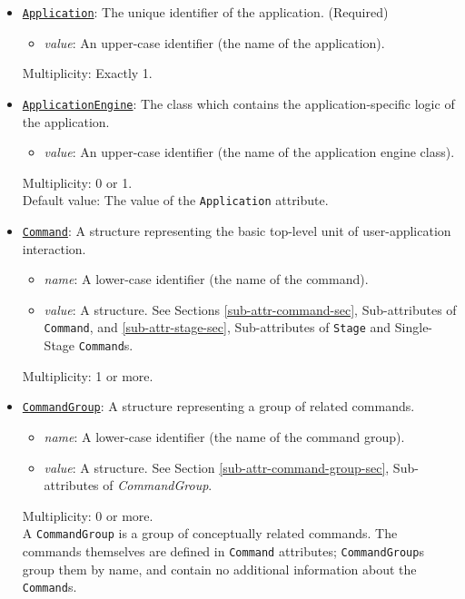 \documentclass[11pt]{article}
\begin{document}
\begin{itemize}

\item \underline{\tt Application}:  The unique
identifier of the application.  (Required)
\begin{itemize}
\item {\it value}: An upper-case identifier (the name of the application).
\end{itemize}
Multiplicity: Exactly 1. \\

\item \underline{\tt ApplicationEngine}:  The class which contains the
application-specific logic of the application.
\begin{itemize}
\item {\it value}: An upper-case identifier (the name of the
  application engine class).
\end{itemize}
Multiplicity: 0 or 1. \\
Default value: The value of the {\tt Application} attribute.

\item \underline{\tt Command}:  A structure representing the basic
top-level unit of user-application interaction.
\begin{itemize}
\item {\it name}: A lower-case identifier (the name of the command).
\item {\it value}: A structure.  See Sections
  \ref{sub-attr-command-sec}, Sub-attributes of {\tt Command},
  and \ref{sub-attr-stage-sec}, Sub-attributes of {\tt Stage} and
  Single-Stage {\tt Command}s.
\end{itemize}
Multiplicity: 1 or more.

\item \underline{\tt CommandGroup}:  A structure representing a
group of related commands.
\begin{itemize}
\item {\it name}: A lower-case identifier (the name of the command group).
\item {\it value}: A structure.  See Section
  \ref{sub-attr-command-group-sec}, Sub-attributes of {\it CommandGroup}.
\end{itemize}
Multiplicity: 0 or more. \\
A {\tt CommandGroup} is a group of conceptually related commands.
The commands themselves are defined in {\tt Command} attributes;
{\tt CommandGroup}s group them by name, and contain no additional
information about the {\tt Command}s.


\end{itemize}
\end{document}
